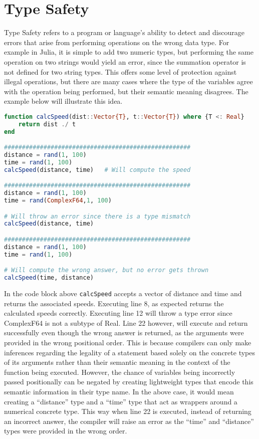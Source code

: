 \section{Type Safety}
Type Safety refers to a program or language's ability to detect and discourage errors that arise from performing
operations on the wrong data type. For example in Julia, it is simple to add two numeric types, but performing the same
operation on two strings would yield an error, since the summation operator is not defined for two string types. This
offers some level of protection against illegal operations, but there are many cases where the type of the variables
agree with the operation being performed, but their semantic meaning disagrees. The example below will illustrate this
idea.
\begin{lstlisting}[language=Julia]
function calcSpeed(dist::Vector{T}, t::Vector{T}) where {T <: Real}
    return dist ./ t
end

#################################################### 
distance = rand(1, 100)
time = rand(1, 100)
calcSpeed(distance, time)   # Will compute the speed

#################################################### 
distance = rand(1, 100)
time = rand(ComplexF64,1, 100)

# Will throw an error since there is a type mismatch
calcSpeed(distance, time)  

#################################################### 
distance = rand(1, 100)
time = rand(1, 100)

# Will compute the wrong answer, but no error gets thrown
calcSpeed(time, distance) 
\end{lstlisting}
In the code block above \lstinline[language=Julia]{calcSpeed} accepts a vector of distance and time and returns the
associated speeds. Executing line 8, as expected returns the calculated speeds correctly. Executing line 12 will throw a
type error since ComplexF64 is not a subtype of Real. Line 22 however, will execute and return successfully even though
the wrong answer is returned, as the arguments were provided in the wrong positional order. This is because compilers
can only make inferences regarding the legality of a statement based solely on the concrete types of its arguments
rather than their semantic meaning in the context of the function being executed. However, the chance of variables being
incorrectly passed positionally can be negated by creating lightweight types that encode this semantic information in
their type name. In the above case, it would mean creating a ``distance'' type and a ``time'' type that act as wrappers
around a numerical concrete type. This way when line 22 is executed, instead of returning an incorrect answer, the
compiler will raise an error as the ``time'' and ``distance'' types were provided in the wrong order.
